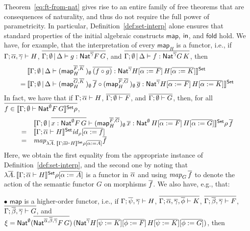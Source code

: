 \documentclass{lmcs}
\theoremstyle{plain}\newtheorem{satz}[thm]{Satz}
\newcommand{\fold}{\mathsf{fold}}
\renewcommand{\id}{\mathit{id}}
\newcommand{\map}{\mathsf{map}}
\begin{document}
{Theorem~\ref{eq:ft-from-nat} gives rise to an entire family of free
theorems that are consequences of naturality, and thus do not require
the full power of parametricity. In particular,
Definition~\ref{def:set-interp} alone ensures that standard properties
of the initial algebraic constructs $\map$, $\mathsf{in}$, and $\fold$
hold. We have, for example, that the interpretation of every $\map_H$
is a functor, i.e., if $\Gamma; \overline{\alpha}, \overline{\gamma} \vdash H$,
$\overline{\Gamma; \emptyset \,|\, \Delta \vdash g : \mathsf{Nat}^{\overline{\gamma}} F \,
  G}$, and $\overline{\Gamma; \emptyset \,|\, \Delta \vdash f :
  \mathsf{Nat}^{\overline{\gamma}} G \, K}$, then
  \begin{align*}
&\setsem{
\Gamma; \emptyset \,|\, \Delta \vdash 
  (\map^{\ol{F}, \ol{K}}_H \,)_{\emptyset} \, \ol{(f \circ g)}
  : \Nat^{\ol\gamma} H[\ol{\alpha := F}] \, H[\ol{\alpha := K}]} \\ 
= \hspace{0.03in} 
  &\setsem{
  \Gamma; \emptyset \,|\, \Delta \vdash 
  (\map^{\ol{G}, \ol{K}}_H \,)_{\emptyset} \, \ol{f} \circ 
  (\map^{\ol{F}, \ol{G}}_H \,)_{\emptyset} \, \ol{g}
  : \Nat^{\ol\gamma} H[\ol{\alpha := F}] \, H[\ol{\alpha := K}]}
\end{align*}
In fact, we have that if $\Gamma; \overline{\alpha} \vdash H$, $\overline{\Gamma;
  \emptyset \vdash F}$, and $\overline{\Gamma; \emptyset \vdash G}$, then,
for all $\overline{f \in \llbracket{\Gamma;\emptyset \vdash \mathsf{Nat}^\emptyset
    F\,G}\rrbracket^{\mathsf{Set}}\rho}$,
\[\begin{array}{rl}
&\setsem{ \Gamma;\emptyset\,|\,\ol{x : \Nat^\emptyset F \, G}
  \vdash (\map^{\ol{F},\ol{G}}_H)_\emptyset\,\ol x :
  \Nat^{\emptyset}\,H[\ol{\alpha := F}]\,H[\ol{\alpha := G}]}
\rho\,\ol f\\ =& \setsem{\Gamma; \ol{\alpha}\vdash H}
\id_{\rho}[\ol{\alpha := f}] \\ =&
\mathit{map}_{\lambda \ol{A}.\,\setsem{\Gamma; \ol{\alpha}\vdash H} \rho [\ol{\alpha := A}]} \ol{f} \\
\end{array}\]
Here, we obtain the first equality from the appropriate instance of
Definition~\ref{def:set-interp}, and the second one by noting that
$\lambda \overline{A}.\,\llbracket{\Gamma; \overline{\alpha}\vdash H}\rrbracket^{\mathsf{Set}} \rho
[\overline{\alpha := A}]$ is a functor in $\overline{\alpha}$ and using
$\mathit{map}_G\,\overline{f}$ to denote the action of the semantic functor
$G$ on morphisms $\overline{f}$. We also have, e.g., that:

\vspace*{0.1in}

\noindent
$\bullet$\; $\map$ is a higher-order functor, i.e., if $\Gamma;
\overline{\psi}, \overline{\gamma} \vdash H$,\; $\overline{\Gamma; \overline{\alpha},
  \overline{\gamma}, \overline{\phi} \vdash K}$,\; $\overline{\Gamma; \overline{\beta},
  \overline{\gamma} \vdash F}$,\; $\overline{\Gamma; \overline{\beta}, \overline{\gamma}
  \vdash G}$, and $\xi = \mathsf{Nat}^{\emptyset} (\overline{\mathsf{Nat}^{\overline{\alpha},
    \overline{\beta}, \overline{\gamma}} F\, G})\, (\mathsf{Nat}^{\overline{\gamma}} H[\overline{\psi
    := K}][\overline{\phi := F}]\, H[\overline{\psi := K}][\overline{\phi := G}])$, then

}
\end{document}
